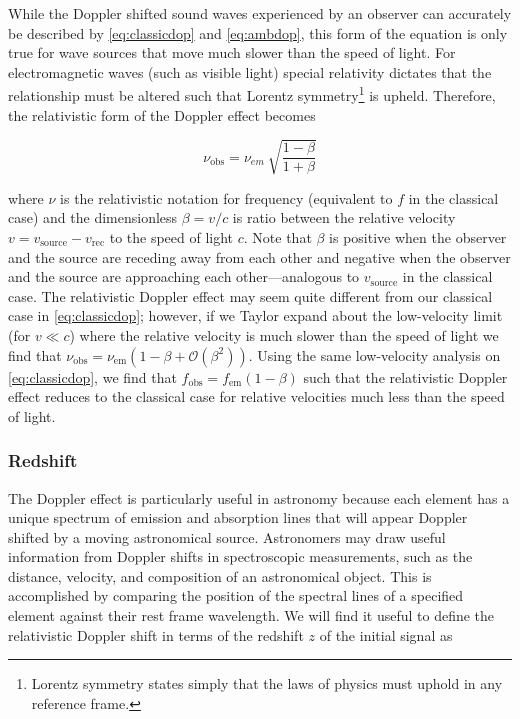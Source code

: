 While the Doppler shifted sound waves experienced by an observer can
accurately be described by \cref{eq:classicdop} and
\cref{eq:ambdop}, this form of the equation is only true
for wave sources that move much slower than the speed of light. For
electromagnetic waves (such as visible light) special relativity
dictates that the relationship must be altered such that Lorentz
symmetry\footnote{Lorentz symmetry states simply that the laws of physics must uphold in any reference frame.}
is upheld. Therefore, the relativistic form of the Doppler effect
becomes

\begin{equation}\nu_\text{obs} = \nu_{em}\ \sqrt{\frac{1- \beta}{1 + \beta}}\label{eq:reldop}\end{equation}

\noindent where \(\nu\) is the relativistic notation for frequency
(equivalent to \(f\) in the classical case) and the dimensionless
\(\beta = v/c\) is ratio between the relative velocity
\(v = v_\text{source} - v_\text{rec}\) to the speed of light \(c\). Note
that \(\beta\) is positive when the observer and the source are receding
away from each other and negative when the observer and the source are
approaching each other---analogous to \(v_\text{source}\) in the
classical case. The relativistic Doppler effect may seem quite different
from our classical case in \cref{eq:classicdop}; however,
if we Taylor expand about the low-velocity limit (for \(v \ll c\)) where
the relative velocity is much slower than the speed of light we find
that
\(\nu_\text{obs} = \nu_\text{em} \left( 1 - \beta + \mathcal{O}(\beta^2) \right)\).
Using the same low-velocity analysis on
\cref{eq:classicdop}, we find that
\(f_\text{obs} = f_\text{em} \left( 1 - \beta \right)\) such that the
relativistic Doppler effect reduces to the classical case for relative
velocities much less than the speed of light.

\subsubsection{Redshift}\label{redshift}

The Doppler effect is particularly useful in astronomy because each
element has a unique spectrum of emission and absorption lines that will
appear Doppler shifted by a moving astronomical source. Astronomers may
draw useful information from Doppler shifts in spectroscopic
measurements, such as the distance, velocity, and composition of an
astronomical object. This is accomplished by comparing the position of
the spectral lines of a specified element against their rest frame
wavelength. We will find it useful to define the relativistic Doppler
shift in terms of the redshift \(z\) of the initial signal as

